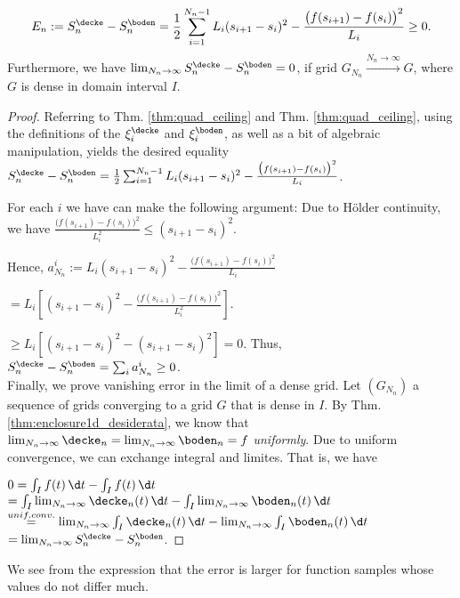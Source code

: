 \begin{thm}
\[E_n := S^\decke_n - S^\boden_n = \frac{1}{2} \sum_{i=1}^{{N_n}-1} L_i (s_{i+1} -s_i)^2 - \frac{\bigl(f(s_{i+1}) -f(s_i)\bigr)^2}{L_i} \geq 0.\] 
Furthermore, we have $\lim_{{N_n} \to \infty} S^\decke_n - S^\boden_n =0$, if grid $G_{N_n} \stackrel{{N_n} \to \infty}{\to} G$, where $G$ is dense in domain interval $I$. 

\begin{proof}
Referring to Thm. \ref{thm:quad_ceiling} and Thm. \ref{thm:quad_ceiling}, using the definitions of the $\xi^\decke_i$ and $\xi^\boden_i$, as well as a bit of algebraic manipulation, yields the desired equality 
$S^\decke_n - S^\boden_n = \frac{1}{2} \sum_{i=1}^{{N_n}-1} L_i (s_{i+1} -s_i)^2 - \frac{\bigl(f(s_{i+1}) -f(s_i)\bigr)^2}{L_i}$. 

For each $i$ we have can make the following argument:
Due to H\"older continuity, we have  
$\frac{\bigl(f(s_{i+1}) -f(s_i)\bigr)^2}{L_i^2}  \leq (s_{i+1}-s_i)^2$.

Hence,
$a_{N_n}^i:=L_i (s_{i+1} -s_i)^2 - \frac{\bigl(f(s_{i+1}) -f(s_i)\bigr)^2}{L_i}$

$=L_i [(s_{i+1} -s_i)^2 - \frac{\bigl(f(s_{i+1}) -f(s_i)\bigr)^2}{L_i^2}]$.

$\geq L_i [(s_{i+1} -s_i)^2 - (s_{i+1} -s_i)^2] =0$.
Thus, $S^\decke_n - S^\boden_n = \sum_i a_{N_n}^i \geq 0$. \\

Finally, we prove vanishing error in the limit of a dense grid. 
Let $(G_{N_n})$ a sequence of grids converging to a grid $G$ that is dense in $I$. By Thm. \ref{thm:enclosure1d_desiderata}, we know that $\lim_{{N_n} \to \infty} \decke_n = \lim_{{N_n} \to \infty}
    \boden_n = f$ \textit{uniformly}. Due to uniform convergence, we can exchange integral and limites. That is, we have 

$0 = \int_I f(t) \, \d t - \int_I f(t) \, \d t$
$=  \int_I \lim_{{N_n} \to \infty} \decke_n(t) \, \d t  - \int_I \lim_{{N_n} \to \infty}  \boden_n (t) \, \d t$
$\stackrel{unif. conv.}{=} \lim_{{N_n} \to \infty} \int_I \decke_n(t) \, \d t  - \lim_{{N_n} \to \infty} \int_I \boden_n (t) \, \d t$    
$=\lim_{{N_n} \to \infty} S^\decke_n - S^\boden_n $.






\end{proof}

\end{thm}

We see from the expression that the error is larger for function samples whose values do not differ much. 


%
%
%

